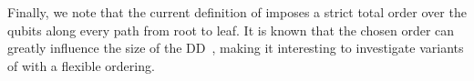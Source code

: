 Finally, we note that the current definition of \limdd imposes a strict total order
over the qubits along every path from root to leaf.
It is known that the chosen order can greatly influence the size of the DD~\cite{rudell1993dynamic,wegener2000branching},
making it interesting to investigate variants of \limdds with a flexible ordering.

